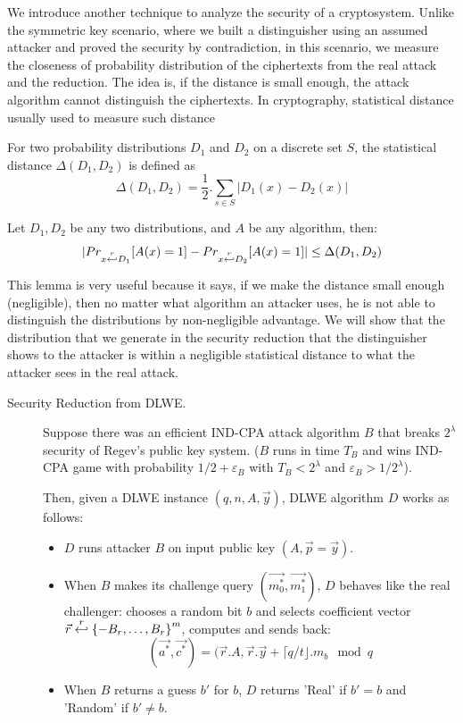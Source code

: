 \begin{description}
  We introduce another technique to analyze the security of a
  cryptosystem. Unlike the symmetric key scenario, where we built a
  distinguisher using an assumed attacker and proved the security by
  contradiction, in this scenario, we measure the closeness of probability
  distribution of the ciphertexts from the real attack and the reduction. The
  idea is, if the distance is small enough, the attack algorithm cannot
  distinguish the ciphertexts. In cryptography, statistical distance usually
  used to measure such distance
  \begin{definition}
     For two probability distributions $D_1$ and $D_2$ on
    a discrete set $S$, the statistical distance $\Delta(D_1,D_2)$ is defined as
    \[
      \Delta(D_1, D_2) = \frac{1}{2}. \sum_{s \in S}|D_1(x) - D_2(x)|
    \]
    \label{def:statisticalDistance}
  \end{definition}
  \begin{lemma}
    Let $D_1, D_2$ be any two distributions, and $A$ be any algorithm, then:
    \[
      |Pr_{x\stackrel{r}{\hookleftarrow} D_1}[A(x) = 1] - Pr_{x\stackrel{r}{\hookleftarrow} D_2}[A(x) = 1]|
      \leq \Delta(D_1, D_2)
    \]
    \label{lem:statisticalDistance}
  \end{lemma}
  This lemma is very useful because it says, if we make the distance small
  enough (negligible), then no matter what algorithm an attacker uses, he is not
  able to distinguish the distributions by non-negligible advantage. We will
  show that the distribution that we generate in the security reduction that the
  distinguisher shows to the attacker is within a negligible statistical
  distance to what the attacker sees in the real attack.

  \begin{description}
  \item[Security Reduction from DLWE.] Suppose there was an efficient IND-CPA
    attack algorithm $B$ that breaks $2^\lambda$ security of Regev's public key
    system. ($B$ runs in time $T_B$ and wins IND-CPA game with probability
    $1/2 + \varepsilon_B$ with $T_B < 2^\lambda$ and
    $\varepsilon_B > 1/2^\lambda$).

    Then, given a DLWE instance $(q,n,A,\vec{y})$, DLWE algorithm $D$ works as
    follows:
    \begin{itemize}
    \item $D$ runs attacker $B$ on input public key $(A, \vec{p} = \vec{y})$.
    \item When $B$ makes its challenge query $(\vec{m_0^*}, \vec{m_1^*})$, $D$
      behaves like the real challenger: chooses a random bit $b$ and selects
      coefficient vector
      $\vec{r} \stackrel{r}{\hookleftarrow} \left\{ -B_r, \dots, B_r \right\}^m$, computes and
      sends back:
      \[
        (\vec{a^*}, \vec{c^*}) = (\vec{r}.A, \vec{r}.\vec{y} + \lceil q/t
        \rfloor .  m_b \mod q
      \]
    \item When $B$ returns a guess $b'$ for $b$, $D$ returns 'Real' if $b'=b$
      and 'Random' if $b' \neq b$.
    \end{itemize}


\end{description}
\end{description}
